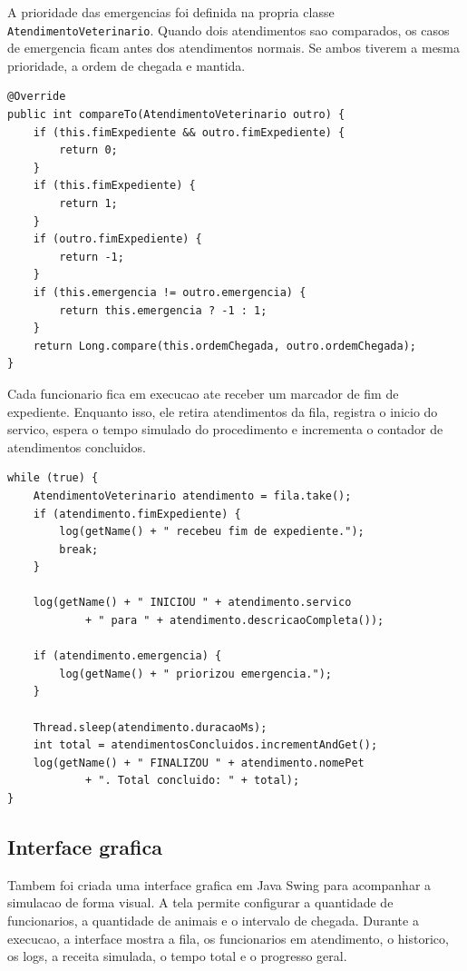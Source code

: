 A prioridade das emergencias foi definida na propria classe \texttt{AtendimentoVeterinario}. Quando dois atendimentos sao comparados, os casos de emergencia ficam antes dos atendimentos normais. Se ambos tiverem a mesma prioridade, a ordem de chegada e mantida.

\begin{lstlisting}[caption={Criterio de prioridade dos atendimentos.}, label={cod:q2-prioridade}]
@Override
public int compareTo(AtendimentoVeterinario outro) {
    if (this.fimExpediente && outro.fimExpediente) {
        return 0;
    }
    if (this.fimExpediente) {
        return 1;
    }
    if (outro.fimExpediente) {
        return -1;
    }
    if (this.emergencia != outro.emergencia) {
        return this.emergencia ? -1 : 1;
    }
    return Long.compare(this.ordemChegada, outro.ordemChegada);
}
\end{lstlisting}

Cada funcionario fica em execucao ate receber um marcador de fim de expediente. Enquanto isso, ele retira atendimentos da fila, registra o inicio do servico, espera o tempo simulado do procedimento e incrementa o contador de atendimentos concluidos.

\begin{lstlisting}[caption={Execucao de uma thread de funcionario.}, label={cod:q2-funcionario}]
while (true) {
    AtendimentoVeterinario atendimento = fila.take();
    if (atendimento.fimExpediente) {
        log(getName() + " recebeu fim de expediente.");
        break;
    }

    log(getName() + " INICIOU " + atendimento.servico
            + " para " + atendimento.descricaoCompleta());

    if (atendimento.emergencia) {
        log(getName() + " priorizou emergencia.");
    }

    Thread.sleep(atendimento.duracaoMs);
    int total = atendimentosConcluidos.incrementAndGet();
    log(getName() + " FINALIZOU " + atendimento.nomePet
            + ". Total concluido: " + total);
}
\end{lstlisting}

\subsection{Interface grafica}

Tambem foi criada uma interface grafica em Java Swing para acompanhar a simulacao de forma visual. A tela permite configurar a quantidade de funcionarios, a quantidade de animais e o intervalo de chegada. Durante a execucao, a interface mostra a fila, os funcionarios em atendimento, o historico, os logs, a receita simulada, o tempo total e o progresso geral.

